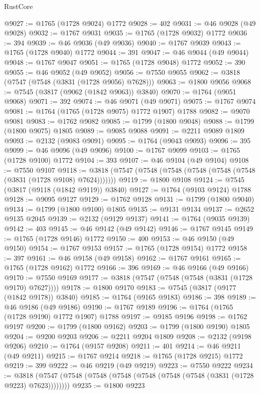 \begin{lexlean}{RustCore}
\begin{coremodule}
@9027 := @1765 (@1728 @9024) @1772
@9028 := 402
@9031 := @46 @9028 (@49 @9028)
@9032 := @1767 @9031
@9035 := @1765 (@1728 @9032) @1772
@9036 := 394
@9039 := @46 @9036 (@49 @9036)
@9040 := @1767 @9039
@9043 := @1765 (@1728 @9040) @1772
@9044 := 391
@9047 := @46 @9044 (@49 @9044)
@9048 := @1767 @9047
@9051 := @1765 (@1728 @9048) @1772
@9052 := 390
@9055 := @46 @9052 (@49 @9052)
@9056 := @7550 @9055
@9062 := @3818 (@7547 (@7548 (@3831 (@1728 @9056) @7628)))
@9063 := @1800 @9056
@9068 := @7545 (@3817 (@9062 (@1842 @9063)) @3840)
@9070 := @1764 (@9051 @9068)
@9071 := 392
@9074 := @46 @9071 (@49 @9071)
@9075 := @1767 @9074
@9081 := @1764 (@1765 (@1728 @9075) @1772 @1907) @1788
@9082 := @9070 @9081
@9083 := @1762 @9082
@9085 := @1799 (@1800 @9048)
@9088 := @1799 (@1800 @9075) @1805
@9089 := @9085 @9088
@9091 := @2211 @9089 @1809
@9093 := @2132 (@9083 @9091)
@9095 := @1764 (@9043 @9093)
@9096 := 395
@9099 := @46 @9096 (@49 @9096)
@9100 := @1767 @9099
@9103 := @1765 (@1728 @9100) @1772
@9104 := 393
@9107 := @46 @9104 (@49 @9104)
@9108 := @7550 @9107
@9118 := @3818 (@7547 (@7548 (@7548 (@7548 (@7548 (@7548 (@3831 (@1728 @9108) @7624)))))))
@9119 := @1800 @9108
@9124 := @7545 (@3817 (@9118 (@1842 @9119)) @3840)
@9127 := @1764 (@9103 @9124) @1788
@9128 := @9095 @9127
@9129 := @1762 @9128
@9131 := @1799 (@1800 @9040)
@9134 := @1799 (@1800 @9100) @1805
@9135 := @9131 @9134
@9137 := @2652 @9135 @2045
@9139 := @2132 (@9129 @9137)
@9141 := @1764 (@9035 @9139)
@9142 := 403
@9145 := @46 @9142 (@49 @9142)
@9146 := @1767 @9145
@9149 := @1765 (@1728 @9146) @1772
@9150 := 400
@9153 := @46 @9150 (@49 @9150)
@9154 := @1767 @9153
@9157 := @1765 (@1728 @9154) @1772
@9158 := 397
@9161 := @46 @9158 (@49 @9158)
@9162 := @1767 @9161
@9165 := @1765 (@1728 @9162) @1772
@9166 := 396
@9169 := @46 @9166 (@49 @9166)
@9170 := @7550 @9169
@9177 := @3818 (@7547 (@7548 (@7548 (@3831 (@1728 @9170) @7627))))
@9178 := @1800 @9170
@9183 := @7545 (@3817 (@9177 (@1842 @9178)) @3840)
@9185 := @1764 (@9165 @9183)
@9186 := 398
@9189 := @46 @9186 (@49 @9186)
@9190 := @1767 @9189
@9196 := @1764 (@1765 (@1728 @9190) @1772 @1907) @1788
@9197 := @9185 @9196
@9198 := @1762 @9197
@9200 := @1799 (@1800 @9162)
@9203 := @1799 (@1800 @9190) @1805
@9204 := @9200 @9203
@9206 := @2211 @9204 @1809
@9208 := @2132 (@9198 @9206)
@9210 := @1764 (@9157 @9208)
@9211 := 401
@9214 := @46 @9211 (@49 @9211)
@9215 := @1767 @9214
@9218 := @1765 (@1728 @9215) @1772
@9219 := 399
@9222 := @46 @9219 (@49 @9219)
@9223 := @7550 @9222
@9234 := @3818 (@7547 (@7548 (@7548 (@7548 (@7548 (@7548 (@7548 (@3831 (@1728 @9223) @7623))))))))
@9235 := @1800 @9223

\end{coremodule}
\end{lexlean}
